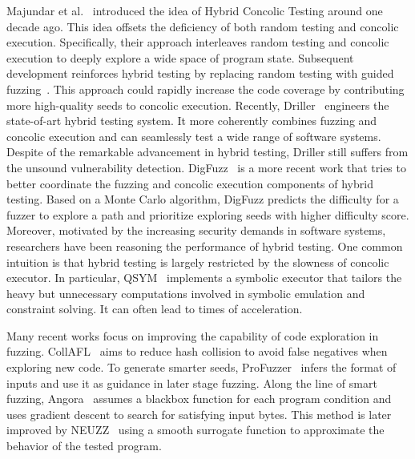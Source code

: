 Majundar et al.~\cite{majumdar2007hybrid} introduced the idea of Hybrid Concolic
Testing around one decade ago. This idea offsets the deficiency
of both random testing and concolic execution. Specifically,
their approach interleaves random testing and concolic execution
to deeply explore a wide space of program state. Subsequent
development reinforces hybrid testing by replacing random
testing with guided fuzzing~\cite{pak2012hybrid}. This approach could rapidly
increase the code coverage by contributing more high-quality
seeds to concolic execution. Recently, Driller~\cite{driller} engineers
the state-of-art hybrid testing system. It more coherently combines
fuzzing and concolic execution and can seamlessly test
a wide range of software systems. Despite of the remarkable
advancement in hybrid testing, Driller still suffers from the
unsound vulnerability detection. DigFuzz~\cite{DigFuzz} is a more recent
work that tries to better coordinate the fuzzing and concolic
execution components of hybrid testing. Based on a Monte
Carlo algorithm, DigFuzz predicts the difficulty for a fuzzer
to explore a path and prioritize exploring seeds with higher
difficulty score. Moreover, motivated by the increasing security
demands in software systems, researchers have been reasoning
the performance of hybrid testing. One common intuition is
that hybrid testing is largely restricted by the slowness of
concolic executor. In particular, QSYM~\cite{qsyminsu} implements a
symbolic executor that tailors the heavy but unnecessary computations
involved in symbolic emulation and constraint solving.
It can often lead to times of acceleration.

Many recent works focus on improving the capability of
code exploration in fuzzing. CollAFL~\cite{collafl} aims to reduce
hash collision to avoid false negatives when exploring new
code. To generate smarter seeds, ProFuzzer~\cite{profuzzer} infers the
format of inputs and use it as guidance in later stage fuzzing.
Along the line of smart fuzzing, Angora~\cite{angora} assumes a blackbox
function for each program condition and uses gradient
descent to search for satisfying input bytes. This method is
later improved by NEUZZ~\cite{neuzz} using a smooth surrogate
function to approximate the behavior of the tested program.


